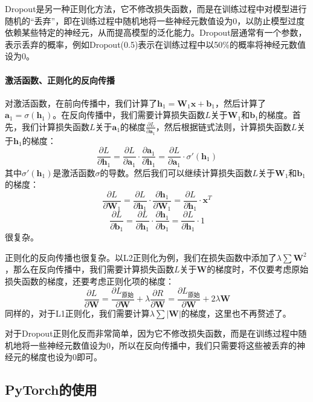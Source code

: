 \documentclass[fontset=none]{ctexart}
\begin{document}
Dropout是另一种正则化方法，它不修改损失函数，而是在训练过程中对模型进行随机的“丢弃”，即在训练过程中随机地将一些神经元数值设为0，以防止模型过度依赖某些特定的神经元，从而提高模型的泛化能力。Dropout层通常有一个参数，表示丢弃的概率，例如Dropout(0.5)表示在训练过程中以50\%的概率将神经元数值设为0。

\paragraph{激活函数、正则化的反向传播}

对激活函数，在前向传播中，我们计算了$\mathbf{h}_1 = \mathbf{W}_1\mathbf{x} + \mathbf{b}_1$，然后计算了$\mathbf{a}_1 = \sigma(\mathbf{h}_1)$。在反向传播中，我们需要计算损失函数$L$关于$\mathbf{W}_1$和$\mathbf{b}_1$的梯度。首先，我们计算损失函数$L$关于$\mathbf{a}_1$的梯度$\frac{\partial L}{\partial \mathbf{a}_1}$，然后根据链式法则，计算损失函数$L$关于$\mathbf{h}_1$的梯度：
\[\frac{\partial L}{\partial \mathbf{h}_1} = \frac{\partial L}{\partial \mathbf{a}_1} \cdot \frac{\partial \mathbf{a}_1}{\partial \mathbf{h}_1} = \frac{\partial L}{\partial \mathbf{a}_1} \cdot \sigma'(\mathbf{h}_1)\]
其中$\sigma'(\mathbf{h}_1)$是激活函数$\sigma$的导数。然后我们可以继续计算损失函数$L$关于$\mathbf{W}_1$和$\mathbf{b}_1$的梯度：
\[\frac{\partial L}{\partial \mathbf{W}_1} = \frac{\partial L}{\partial \mathbf{h}_1} \cdot \frac{\partial \mathbf{h}_1}{\partial \mathbf{W}_1} = \frac{\partial L}{\partial \mathbf{h}_1} \cdot \mathbf{x}^T\]
\[\frac{\partial L}{\partial \mathbf{b}_1} = \frac{\partial L}{\partial \mathbf{h}_1} \cdot \frac{\partial \mathbf{h}_1}{\partial \mathbf{b}_1} = \frac{\partial L}{\partial \mathbf{h}_1} \cdot 1\]
很复杂。

正则化的反向传播也很复杂。以L2正则化为例，我们在损失函数中添加了$\lambda \sum \mathbf{W}^2$，那么在反向传播中，我们需要计算损失函数$L$关于$\mathbf{W}$的梯度时，不仅要考虑原始损失函数的梯度，还要考虑正则化项的梯度：
\[\frac{\partial L}{\partial \mathbf{W}} = \frac{\partial L_{\text{原始}}}{\partial \mathbf{W}} + \lambda \frac{\partial R}{\partial \mathbf{W}} = \frac{\partial L_{\text{原始}}}{\partial \mathbf{W}} + 2\lambda \mathbf{W}\]
同样的，对于L1正则化，我们需要计算$\lambda \sum |\mathbf{W}|$的梯度，这里也不再赘述了。

对于Dropout正则化反而非常简单，因为它不修改损失函数，而是在训练过程中随机地将一些神经元数值设为0，所以在反向传播中，我们只需要将这些被丢弃的神经元的梯度也设为0即可。

\subsection{PyTorch的使用}
\end{document}
